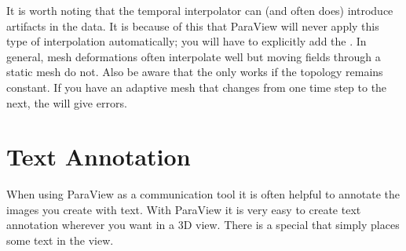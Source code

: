 It is worth noting that the temporal interpolator can (and often does)
introduce artifacts in the data.  It is because of this that ParaView will
never apply this type of interpolation automatically; you will have to
explicitly add the .  In general, mesh
deformations often interpolate well but moving fields through a static mesh
do not.  Also be aware that the  only works if
the topology remains constant.  If you have an adaptive mesh that changes
from one time step to the next, the  will give
errors.


\section{Text Annotation}


When using ParaView as a communication tool it is often helpful to annotate
the images you create with text.  With ParaView it is very easy to create
text annotation wherever you want in a 3D view.  There is a special
 that simply places some text in the view.

